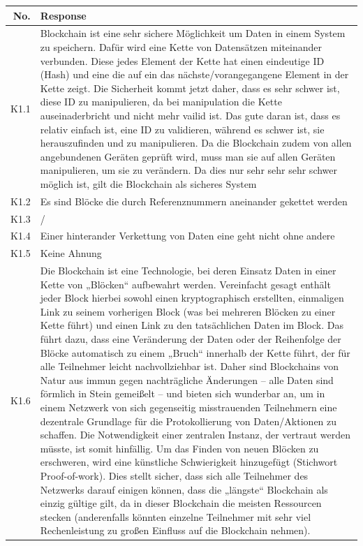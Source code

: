 \begin{table}[H]
    \centering
    \begin{tabularx}{\textwidth}{r|X}
         No. & Response \\ \hline
         K1.1 & Blockchain ist eine sehr sichere Möglichkeit um Daten in einem System zu speichern. Dafür wird eine Kette von Datensätzen miteinander verbunden. Diese jedes Element der Kette hat einen eindeutige ID (Hash) und eine die auf ein das nächste/vorangegangene Element in der Kette zeigt. Die Sicherheit kommt jetzt daher, dass es sehr schwer ist, diese ID zu manipulieren, da bei manipulation die Kette auseinaderbricht und nicht mehr vailid ist. Das gute daran ist, dass es relativ einfach ist, eine ID zu validieren, während es schwer ist, sie herauszufinden und zu manipulieren. Da die Blockchain zudem von allen angebundenen Geräten geprüft wird, muss man sie auf allen Geräten manipulieren, um sie zu verändern. Da dies nur sehr sehr sehr schwer möglich ist, gilt die Blockchain als sicheres System\\
         K1.2 & Es sind Blöcke die durch Referenznummern aneinander gekettet werden \\
         K1.3 & / \\
         K1.4 & Einer hinterander Verkettung von Daten eine geht nicht ohne andere \\
         K1.5 & Keine Ahnung \\
         K1.6 & Die Blockchain ist eine Technologie, bei deren Einsatz Daten in einer Kette von „Blöcken“ aufbewahrt werden. Vereinfacht gesagt enthält jeder Block hierbei sowohl einen kryptographisch erstellten, einmaligen Link zu seinem vorherigen Block (was bei mehreren Blöcken zu einer Kette führt) und einen Link zu den tatsächlichen Daten im Block. Das führt dazu, dass eine Veränderung der Daten oder der Reihenfolge der Blöcke automatisch zu einem „Bruch“ innerhalb der Kette führt, der für alle Teilnehmer leicht nachvollziehbar ist. Daher sind Blockchains von Natur aus immun gegen nachträgliche Änderungen – alle Daten sind förmlich in Stein gemeißelt – und bieten sich wunderbar an, um in einem Netzwerk von sich gegenseitig misstrauenden Teilnehmern eine dezentrale Grundlage für die Protokollierung von Daten/Aktionen zu schaffen. Die Notwendigkeit einer zentralen Instanz, der vertraut werden müsste, ist somit hinfällig. Um das Finden von neuen Blöcken zu erschweren, wird eine künstliche Schwierigkeit hinzugefügt (Stichwort Proof-of-work). Dies stellt sicher, dass sich alle Teilnehmer des Netzwerks darauf einigen können, dass die „längste“ Blockchain als einzig gültige gilt, da in dieser Blockchain die meisten Ressourcen stecken (anderenfalls könnten einzelne Teilnehmer mit sehr viel Rechenleistung zu großen Einfluss auf die Blockchain nehmen). \\

\end{tabularx}
\end{table}
